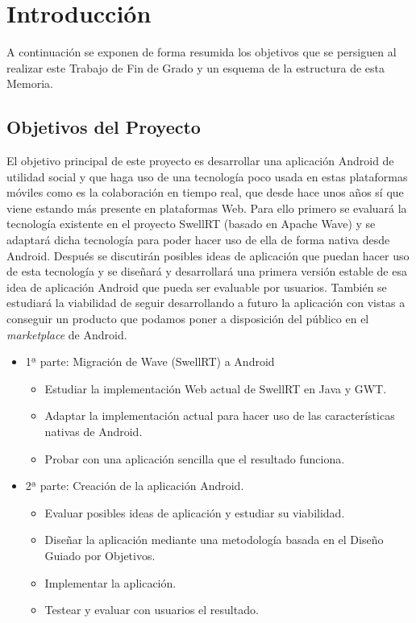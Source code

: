 \newpage
\thispagestyle{sectioned}
\chapter{Introducción}

A continuación se exponen de forma resumida los objetivos que se persiguen al realizar este Trabajo de Fin de Grado y un esquema de la estructura de esta Memoria.
 
\section{Objetivos del Proyecto}

El objetivo principal de este proyecto es desarrollar una aplicación Android de utilidad social y que haga uso de una tecnología poco usada en estas plataformas móviles como es la colaboración en tiempo real, que desde hace unos años sí que viene estando más presente en plataformas Web. Para ello primero se evaluará la tecnología existente en el proyecto SwellRT (basado en Apache Wave) y se adaptará dicha tecnología para poder hacer uso de ella de forma nativa desde Android. Después se discutirán posibles ideas de aplicación que puedan hacer uso de esta tecnología y se diseñará y desarrollará una primera versión estable de esa idea de aplicación Android que pueda ser evaluable por usuarios. También se estudiará la viabilidad de seguir desarrollando a futuro la aplicación con vistas a conseguir un producto que podamos poner a disposición del público en el \textit{marketplace} de Android.

\begin{itemize}
  \item {
    1ª parte: Migración de Wave (SwellRT) a Android
    \begin{itemize}
      \item Estudiar la implementación Web actual de SwellRT en Java y GWT.
      \item Adaptar la implementación actual para hacer uso de las características nativas de Android.
      \item Probar con una aplicación sencilla que el resultado funciona.
    \end{itemize}
  }
  \item {
    2ª parte: Creación de la aplicación Android.
    \begin{itemize}
      \item Evaluar posibles ideas de aplicación y estudiar su viabilidad.
      \item Diseñar la aplicación mediante una metodología basada en el Diseño Guiado por Objetivos.
      \item Implementar la aplicación.
      \item Testear y evaluar con usuarios el resultado.
    \end{itemize}
  }
\end{itemize}

